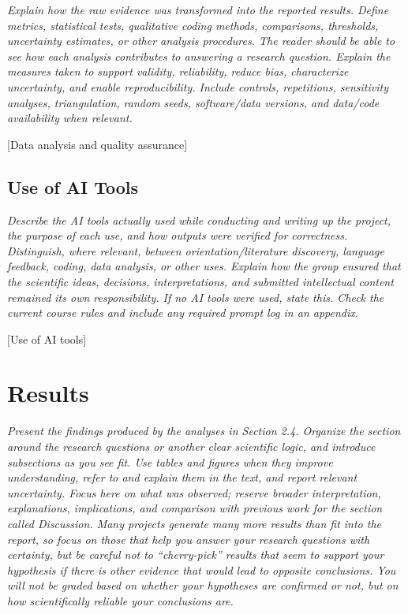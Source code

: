 \documentclass[11pt,a4paper]{article}
\newcommand{\guidance}[1]{%
  {\setstretch{1.0}\fontsize{9}{11}\selectfont\color{guidancetext}\itshape #1\par}%
  \vspace{-6pt}%
}
\newcommand{\placeholder}[1]{#1\par}
\begin{document}
\guidance{Explain how the raw evidence was transformed into the reported results. Define metrics, statistical tests, qualitative coding methods, comparisons, thresholds, uncertainty estimates, or other analysis procedures. The reader should be able to see how each analysis contributes to answering a research question. Explain the measures taken to support validity, reliability, reduce bias, characterize uncertainty, and enable reproducibility. Include controls, repetitions, sensitivity analyses, triangulation, random seeds, software/data versions, and data/code availability when relevant.}

\placeholder{[Data analysis and quality assurance]}

\subsection{Use of AI Tools}

\guidance{Describe the AI tools actually used while conducting and writing up the project, the purpose of each use, and how outputs were verified for correctness. Distinguish, where relevant, between orientation/literature discovery, language feedback, coding, data analysis, or other uses. Explain how the group ensured that the scientific ideas, decisions, interpretations, and submitted intellectual content remained its own responsibility. If no AI tools were used, state this. Check the current course rules and include any required prompt log in an appendix.}

\placeholder{[Use of AI tools]}

\section{Results}

\guidance{Present the findings produced by the analyses in Section 2.4. Organize the section around the research questions or another clear scientific logic, and introduce subsections as you see fit. Use tables and figures when they improve understanding, refer to and explain them in the text, and report relevant uncertainty. Focus here on what was observed; reserve broader interpretation, explanations, implications, and comparison with previous work for the section called Discussion. Many projects generate many more results than fit into the report, so focus on those that help you answer your research questions with certainty, but be careful not to “cherry-pick” results that seem to support your hypothesis if there is other evidence that would lead to opposite conclusions. You will not be graded based on whether your hypotheses are confirmed or not, but on how scientifically reliable your conclusions are.}
\end{document}
